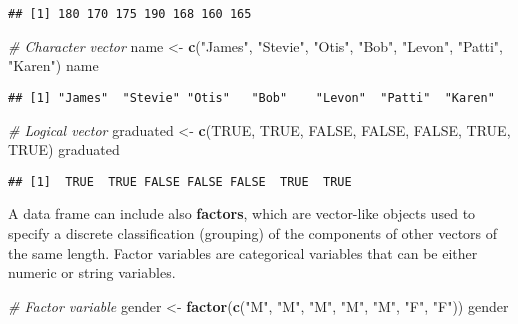 \documentclass[]{book}
\newenvironment{Shaded}{\begin{snugshade}}{\end{snugshade}}
\newcommand{\KeywordTok}[1]{\textcolor[rgb]{0.13,0.29,0.53}{\textbf{{#1}}}}
\newcommand{\StringTok}[1]{\textcolor[rgb]{0.31,0.60,0.02}{{#1}}}
\newcommand{\CommentTok}[1]{\textcolor[rgb]{0.56,0.35,0.01}{\textit{{#1}}}}
\newcommand{\OtherTok}[1]{\textcolor[rgb]{0.56,0.35,0.01}{{#1}}}
\newcommand{\NormalTok}[1]{{#1}}
\begin{document}
\begin{verbatim}
## [1] 180 170 175 190 168 160 165
\end{verbatim}

\begin{Shaded}
\begin{Highlighting}[]
\CommentTok{# Character vector}
\NormalTok{name <-}\StringTok{ }\KeywordTok{c}\NormalTok{(}\StringTok{"James"}\NormalTok{, }\StringTok{"Stevie"}\NormalTok{, }\StringTok{"Otis"}\NormalTok{, }\StringTok{"Bob"}\NormalTok{, }\StringTok{"Levon"}\NormalTok{, }\StringTok{"Patti"}\NormalTok{, }\StringTok{"Karen"}\NormalTok{)}
\NormalTok{name}
\end{Highlighting}
\end{Shaded}

\begin{verbatim}
## [1] "James"  "Stevie" "Otis"   "Bob"    "Levon"  "Patti"  "Karen"
\end{verbatim}

\begin{Shaded}
\begin{Highlighting}[]
\CommentTok{# Logical vector}
\NormalTok{graduated <-}\StringTok{ }\KeywordTok{c}\NormalTok{(}\OtherTok{TRUE}\NormalTok{, }\OtherTok{TRUE}\NormalTok{, }\OtherTok{FALSE}\NormalTok{, }\OtherTok{FALSE}\NormalTok{, }\OtherTok{FALSE}\NormalTok{, }\OtherTok{TRUE}\NormalTok{, }\OtherTok{TRUE}\NormalTok{)}
\NormalTok{graduated}
\end{Highlighting}
\end{Shaded}

\begin{verbatim}
## [1]  TRUE  TRUE FALSE FALSE FALSE  TRUE  TRUE
\end{verbatim}

A data frame can include also \textbf{factors}, which are vector-like
objects used to specify a discrete classification (grouping) of the
components of other vectors of the same length. Factor variables are
categorical variables that can be either numeric or string variables.

\begin{Shaded}
\begin{Highlighting}[]
\CommentTok{# Factor variable}
\NormalTok{gender <-}\StringTok{ }\KeywordTok{factor}\NormalTok{(}\KeywordTok{c}\NormalTok{(}\StringTok{"M"}\NormalTok{, }\StringTok{"M"}\NormalTok{, }\StringTok{"M"}\NormalTok{, }\StringTok{"M"}\NormalTok{, }\StringTok{"M"}\NormalTok{, }\StringTok{"F"}\NormalTok{, }\StringTok{"F"}\NormalTok{))}
\NormalTok{gender}
\end{Highlighting}
\end{Shaded}
\end{document}
